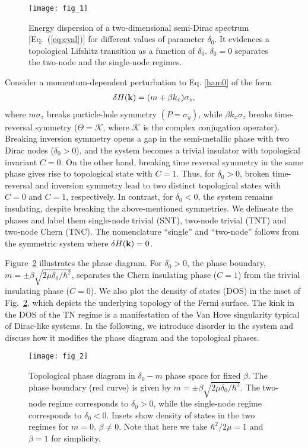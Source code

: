 \documentclass[aps,prb,showpacs,twocolumn,floats]{revtex4-1}
\begin{document}
\begin{figure}
\texttt{[image: fig\_1]}
\caption{Energy dispersion of a two-dimensional semi-Dirac spectrum [Eq.~(\ref{eq:eval})] for different values of parameter $\delta_0$. It evidences a 
topological Lifshitz transition as a function of $\delta_0$. $\delta_0 = 0$ separates the two-node and the single-node regimes.} 
\label{fig:dispersion}
\end{figure}
Consider a momentum-dependent perturbation to Eq. \eqref{ham0} of the form
\begin{align}
\delta H({\bf k}) = (m + \beta k_x)\sigma_z,
\end{align} 
where $m \sigma_z$ breaks particle-hole symmetry $(P=\sigma_y)$, while $\beta k_x\sigma_z$ breaks time-reversal symmetry ($\Theta=\mathcal {K}$, where $\mathcal{K}$ is the complex conjugation operator). Breaking inversion symmetry opens a gap in the semi-metallic phase with two Dirac nodes ($\delta_0>0$), and the system becomes a trivial insulator with topological invariant $C=0$. On the other hand, breaking time reversal symmetry in the same phase gives rise to topological state with $C=1$. Thus, for $\delta_0>0$, broken time-reversal and inversion symmetry lead to two distinct topological states with $C=0$ and $C=1$, respectively.  In contrast, for $\delta_0 < 0$, the system remains insulating, despite breaking the above-mentioned symmetries. We delineate the phases and label them single-node trivial (SNT), two-node trivial (TNT) and two-node Chern (TNC). The nomenclature ``single'' and ``two-node'' follows from the symmetric system where $\delta H({\bf k}) = 0$. 

Figure~\ref{fig:dispersion1} illustrates the phase diagram. For $\delta_0>0$, the phase boundary, $m=\pm \beta\sqrt{2\mu\delta_0/\hbar^2}$, separates the Chern insulating phase ($C=1$) from the trivial insulating phase ($C=0$). We also plot the density of states (DOS) in the inset of Fig.~\ref{fig:dispersion1}, which depicts the underlying topology of the Fermi surface. The kink in the DOS of the TN regime is a manifestation of the Van Hove singularity typical of Dirac-like systems. In the following, we introduce disorder in the system and discuss how it modifies the phase diagram and the topological phases.

\begin{figure}
\texttt{[image: fig\_2]}
\caption{Topological phase diagram in $\delta_0-m$ phase space for fixed $\beta$.
The phase boundary (red curve) is given by $m=\pm\beta\sqrt{2\mu\delta_0/\hbar^2}$. The two-node regime corresponds to $\delta_0>0$, while the single-node regime corresponds to $\delta_0<0$. Insets show density of states in the two regimes for $m=0$, $\beta\ne0$. Note that here we take $\hbar^2/2\mu=1$ and $\beta=1$ for simplicity.} 
\label{fig:dispersion1}
\end{figure}
\end{document}
